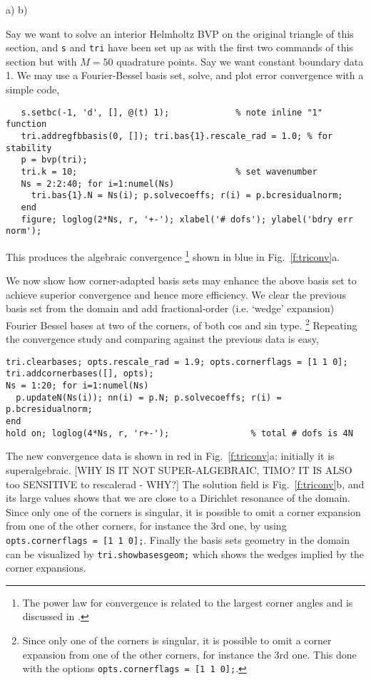 \documentclass[11pt]{article}
\begin{document}
\bfi %
a)
b)
\efi

Say we want to solve an interior Helmholtz BVP on the original triangle
of this section, and {\tt s} and {\tt tri} have been set up as with the
first two commands of this section but with $M=50$ quadrature points.
Say we want constant boundary data 1.
We may use a Fourier-Bessel basis set, solve, and
plot error convergence with a simple code,
\begin{verbatim}
   s.setbc(-1, 'd', [], @(t) 1);             % note inline "1" function
   tri.addregfbbasis(0, []); tri.bas{1}.rescale_rad = 1.0; % for stability
   p = bvp(tri);
   tri.k = 10;                               % set wavenumber
   Ns = 2:2:40; for i=1:numel(Ns)
     tri.bas{1}.N = Ns(i); p.solvecoeffs; r(i) = p.bcresidualnorm;
   end
   figure; loglog(2*Ns, r, '+-'); xlabel('# dofs'); ylabel('bdry err norm');
\end{verbatim}
This produces the algebraic convergence%
  \footnote{The power law for convergence is related to the largest corner
angles and is discussed in \cite{Ei74}.}
shown in blue in Fig.~\ref{f:triconv}a.

We now show how corner-adapted basis sets may enhance
the above basis set to achieve superior convergence and hence
more efficiency. We clear the previous basis set from the domain
and add fractional-order (i.e. `wedge' expansion) Fourier Bessel bases
at two of the corners, of both cos and sin type.%
  \footnote{Since only one of the corners is
    singular, it is possible to omit a corner
    expansion from one of the other corners, for instance the 3rd one.
    This done with the options {\tt opts.cornerflags = [1 1 0];}.}
Repeating the convergence
study and comparing against the previous data is easy,
\begin{verbatim}
tri.clearbases; opts.rescale_rad = 1.9; opts.cornerflags = [1 1 0];
tri.addcornerbases([], opts);
Ns = 1:20; for i=1:numel(Ns)
  p.updateN(Ns(i)); nn(i) = p.N; p.solvecoeffs; r(i) = p.bcresidualnorm;
end
hold on; loglog(4*Ns, r, 'r+-');                % total # dofs is 4N
\end{verbatim}
The new convergence data is shown in red in Fig.~\ref{f:triconv}a;
initially it is superalgebraic.
[WHY IS IT NOT SUPER-ALGEBRAIC, TIMO? IT IS ALSO too SENSITIVE to rescalerad - WHY?]
The solution field is Fig.~\ref{f:triconv}b, and its large values
shows that we are close to a Dirichlet resonance of the domain.
Since only one of the corners is singular, it is possible to omit a corner
expansion from one of the other corners, for instance the 3rd one, by
using {\tt opts.cornerflags = [1 1 0];}.
Finally the basis sets geometry in the domain can be visualized by
{\tt tri.showbasesgeom;} which shows the wedges implied by the corner
expansions.
\end{document}
